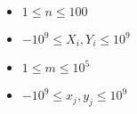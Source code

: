 \begin{itemize}
	\tightlist
	\item $1 \leq n \leq 100$
    \item $-10^9 \leq X_i,Y_i \leq 10^9$
    \item $1 \leq m \leq 10^5$
    \item $-10^9 \leq x_j,y_j \leq 10^9$
\end{itemize}

